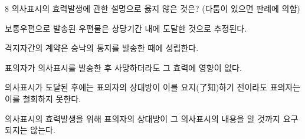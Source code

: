 \begin{question}{8}
의사표시의 효력발생에 관한 설명으로 옳지 않은 것은? (다툼이 있으면 판례에 의함)
\begin{choices}
  \item 보통우편으로 발송된 우편물은 상당기간 내에 도달한 것으로 추정된다.
  \item 격지자간의 계약은 승낙의 통지를 발송한 때에 성립한다.
  \item 표의자가 의사표시를 발송한 후 사망하더라도 그 효력에 영향이 없다.
  \item 의사표시가 도달된 후에는 표의자의 상대방이 이를 요지(了知)하기 전이라도 표의자는 이를 철회하지 못한다.
  \item 의사표시의 효력발생을 위해 표의자의 상대방이 그 의사표시의 내용을 알 것까지 요구되지는 않는다.
\end{choices}
\end{question}
